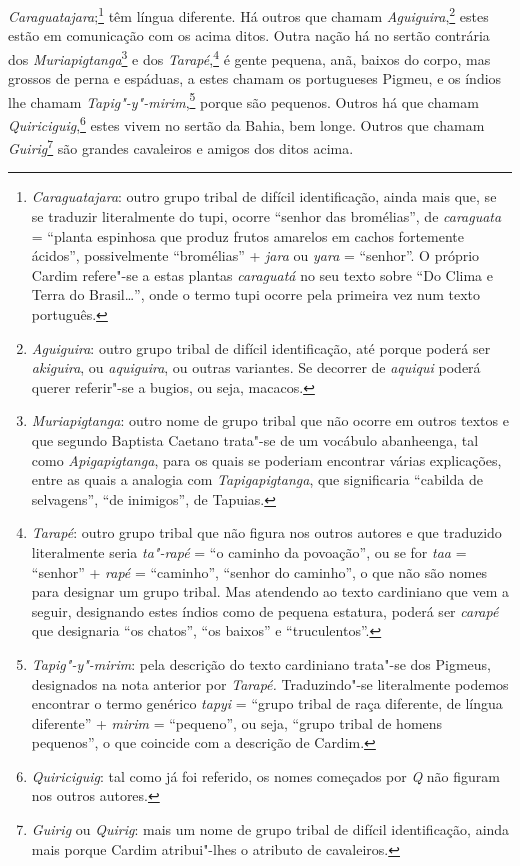 \begin{linenumbers}
\textit{Caraguatajara};\footnote{ \textit{Caraguatajara}: outro grupo
tribal de difícil identificação, ainda mais que, se se traduzir
literalmente do tupi, ocorre ``senhor das bromélias'', de
\textit{caraguata} = ``planta espinhosa que produz frutos amarelos em
cachos fortemente ácidos'', possivelmente ``bromélias'' + \textit{jara} ou
\textit{yara} = ``senhor''. O próprio Cardim refere"-se a estas plantas
\textit{caraguatá} no seu texto sobre ``Do Clima e Terra do
Brasil\ldots{}'', onde o termo tupi ocorre pela primeira vez num texto
português.} têm língua diferente. Há outros que chamam
\textit{Aguiguira},\footnote{ \textit{Aguiguira}: outro grupo tribal
de difícil identificação, até porque poderá ser \textit{akiguira}, ou
\textit{aquiguira}, ou outras variantes. Se decorrer de
\textit{aquiqui} poderá querer referir"-se a bugios, ou seja,
macacos.} estes estão em comunicação com os acima ditos. Outra
nação há no sertão contrária dos \textit{Muriapigtanga}\footnote{ \textit{Muriapigtanga}: 
outro nome de grupo tribal que não ocorre em
outros textos e que segundo Baptista Caetano trata"-se de um vocábulo
abanheenga, tal como \textit{Apigapigtanga}, para os quais se poderiam
encontrar várias explicações, entre as quais a analogia com
\textit{Tapigapigtanga}, que significaria ``cabilda de selvagens'', ``de
inimigos'', de Tapuias.} e dos 
\textit{Tarapé},\footnote{ \textit{Tarapé}: outro grupo tribal que não figura nos
outros autores e que traduzido literalmente seria \textit{ta"-rapé} = 
``o caminho da povoação'', ou se for \textit{taa} = ``senhor'' +
\textit{rapé} = ``caminho'', ``senhor do caminho'', o que não são nomes
para designar um grupo tribal. Mas atendendo ao texto cardiniano que
vem a seguir, designando estes índios como de pequena estatura, poderá
ser \textit{carapé} que designaria ``os chatos'', ``os baixos'' e
``truculentos''.} é gente pequena, anã, baixos do corpo, mas grossos de
perna e espáduas, a estes chamam os portugueses Pigmeu, e os índios lhe
chamam \textit{Tapig"-y"-mirim},\footnote{ \textit{Tapig"-y"-mirim}: pela
descrição do texto cardiniano trata"-se dos Pigmeus, designados na nota
anterior por \textit{Tarapé.} Traduzindo"-se literalmente podemos
encontrar o termo genérico \textit{tapyi} = ``grupo tribal de raça
diferente, de língua diferente'' + \textit{mirim} = ``pequeno'', ou seja,
``grupo tribal de homens pequenos'', o que coincide com a descrição de
Cardim.} porque são pequenos. Outros há que chamam
\textit{Quiriciguig},\footnote{ \textit{Quiriciguig}: tal como já foi
referido, os nomes começados por \textit{Q} não figuram nos outros
autores.} estes vivem no sertão da Bahia, bem longe. Outros
que chamam \textit{Guirig}\footnote{ \textit{Guirig} ou \textit{Quirig}:  
mais um nome de grupo tribal de difícil identificação, ainda mais
porque Cardim atribui"-lhes o atributo de cavaleiros.} são
grandes cavaleiros e amigos dos ditos acima.


\end{linenumbers}
